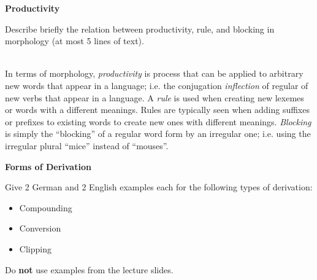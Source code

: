 \documentclass[11pt]{article}
\begin{document}
\vspace*{0.5cm}

\begin{problem}{4}
\textbf{Productivity}

Describe briefly the relation between productivity, rule, and blocking in morphology (at most
5 lines of text).

\end{problem}

\begin{solution} \\
In terms of morphology, \textit{productivity} is process that can be applied to arbitrary new words that appear in a language; i.e. the conjugation \textit{inflection} of regular of new verbs that appear in a language.  A \textit{rule} is used when creating new lexemes or words with a different meanings.  Rules are typically seen when adding suffixes or prefixes to existing words to create new ones with different meanings. \textit{Blocking} is simply the ``blocking'' of a regular word form by an irregular one; i.e. using the irregular plural ``mice'' instead of ``mouses''.
\end{solution}

\vspace*{0.5cm}
\newpage

\begin{problem}{5}
\textbf{Forms of Derivation}

Give 2 German and 2 English examples each for the following types of derivation:
\begin{itemize}
	\item Compounding
	\item Conversion
	\item Clipping
\end{itemize}

Do \textbf{not} use examples from the lecture slides.

\end{problem}
\end{document}
